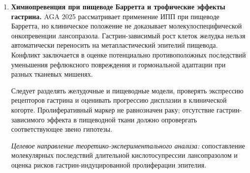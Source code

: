 \documentclass[11pt,a4paper,notitlepage]{report}
\newcommand{\src}[1]{\unskip\space\cite{#1}}
\begin{document}
\begin{enumerate}[label=\textbf{\arabic*.},start=7,leftmargin=*,itemsep=0.9\baselineskip]
\item \textbf{Химиопревенция при пищеводе Барретта и трофические эффекты гастрина.} AGA 2025 рассматривает применение ИПП при пищеводе Барретта, но клиническое положение не доказывает молекулоспецифической онкопревенции лансопразола. Гастрин-зависимый рост клеток желудка нельзя автоматически переносить на метапластический эпителий пищевода. Конфликт заключается в оценке потенциально противоположных последствий уменьшения рефлюксного повреждения и гормональной адаптации при разных тканевых мишенях.\src{barrett2025,withdrawsheng2020}

Следует разделять желудочные и пищеводные модели, проверять экспрессию рецепторов гастрина и оценивать прогрессию дисплазии в клинической когорте. Пролиферативный маркер не равнозначен раку; отсутствие гастрин-зависимого эффекта в пищеводной ткани должно опровергать соответствующее звено гипотезы.

\textit{Целевое направление теоретико-экспериментального анализа:} сопоставление молекулярных последствий длительной кислотосупрессии лансопразолом и оценка рисков гастрин-индуцированной пролиферации эпителия.

\end{enumerate}
\end{document}

